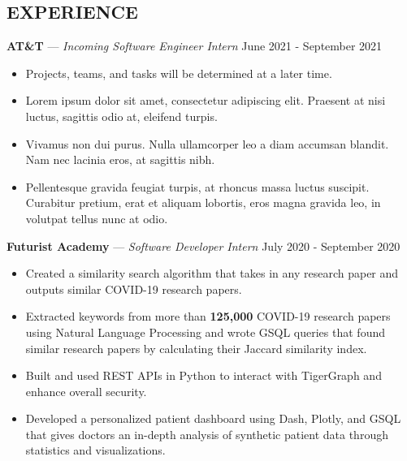 \documentclass[11pt]{res}
\begin{document}
\begin{footnotesize}
\begin{resume}
\begin{small}
\section{EXPERIENCE}
\end{small}
\vspace{.5mm}
\textbf{AT\&T} — {\sl Incoming Software Engineer Intern} \hfill June 2021 - September 2021\vspace{-5mm}
\begin{itemize}[leftmargin=6.25mm] \itemsep -2pt 
\item Projects, teams, and tasks will be determined at a later time. 
\vspace{1.30mm}
\item Lorem ipsum dolor sit amet, consectetur adipiscing elit. Praesent at nisi luctus, sagittis odio at, eleifend turpis.
\vspace{1.30mm}
\item Vivamus non dui purus. Nulla ullamcorper leo a diam accumsan blandit. Nam nec lacinia eros, at sagittis nibh.
\vspace{1.30mm}
\item Pellentesque gravida feugiat turpis, at rhoncus massa luctus suscipit. Curabitur pretium, erat et aliquam lobortis, eros magna gravida leo, in volutpat tellus nunc at odio.
\end{itemize}
\vspace{-2.5mm}
\textbf{Futurist Academy} — {\sl Software Developer Intern} \hfill July 2020 - September 2020\vspace{-5mm}
\begin{itemize}[leftmargin=6.25mm] \itemsep -2pt 
\item Created a similarity search algorithm that takes in any research paper and outputs similar COVID-19 research papers.
\vspace{1.30mm}
\item Extracted keywords from more than \textbf{125,000} COVID-19 research papers using Natural Language Processing and wrote GSQL queries that found similar research papers by calculating their Jaccard similarity index. 
\vspace{1.30mm}
\item Built and used REST APIs in Python to interact with TigerGraph and enhance overall security.
\vspace{1.30mm}
\item Developed a personalized patient dashboard using Dash, Plotly, and GSQL that gives doctors an in-depth analysis of synthetic patient data through statistics and visualizations.

\end{itemize}
\end{resume}
\end{footnotesize}
\end{document}

